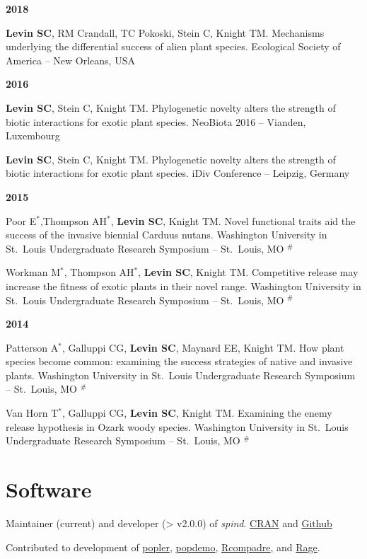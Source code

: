 \documentclass[11pt,]{article}
\begin{document}
\textbf{2018}

\textbf{Levin SC}, RM Crandall, TC Pokoski, Stein C, Knight TM.
Mechanisms underlying the differential success of alien plant species.
Ecological Society of America -- New Orleans, USA

\textbf{2016}

\textbf{Levin SC}, Stein C, Knight TM. Phylogenetic novelty alters the
strength of biotic interactions for exotic plant species. NeoBiota 2016
-- Vianden, Luxembourg

\textbf{Levin SC}, Stein C, Knight TM. Phylogenetic novelty alters the
strength of biotic interactions for exotic plant species. iDiv
Conference -- Leipzig, Germany

\textbf{2015}

Poor E\(^\ast\),Thompson AH\(^\ast\), \textbf{Levin SC}, Knight TM.
Novel functional traits aid the success of the invasive biennial Carduus
nutans. Washington University in St.~Louis Undergraduate Research
Symposium -- St.~Louis, MO \(^\#\)

Workman M\(^\ast\), Thompson AH\(^\ast\), \textbf{Levin SC}, Knight TM.
Competitive release may increase the fitness of exotic plants in their
novel range. Washington University in St.~Louis Undergraduate Research
Symposium -- St.~Louis, MO \(^\#\)

\textbf{2014}

Patterson A\(^\ast\), Galluppi CG, \textbf{Levin SC}, Maynard EE, Knight
TM. How plant species become common: examining the success strategies of
native and invasive plants. Washington University in St.~Louis
Undergraduate Research Symposium -- St.~Louis, MO \(^\#\)

Van Horn T\(^\ast\), Galluppi CG, \textbf{Levin SC}, Knight TM.
Examining the enemy release hypothesis in Ozark woody species.
Washington University in St.~Louis Undergraduate Research Symposium --
St.~Louis, MO \(^\#\)

\section{Software}\label{software}

Maintainer (current) and developer (\textgreater{} v2.0.0) of
\emph{spind}.
\href{https://cran.r-project.org/web/checks/check_results_spind.html}{CRAN}
and \href{https://github.com/levisc8/spind}{Github}

Contributed to development of
\href{https://github.com/AldoCompagnoni/popler}{popler},
\href{https://github.com/iainmstott/popdemo}{popdemo},
\href{https://github.com/jonesor/Rcompadre}{Rcompadre}, and
\href{https://github.com/jonesor/Rage}{Rage}.
\end{document}

